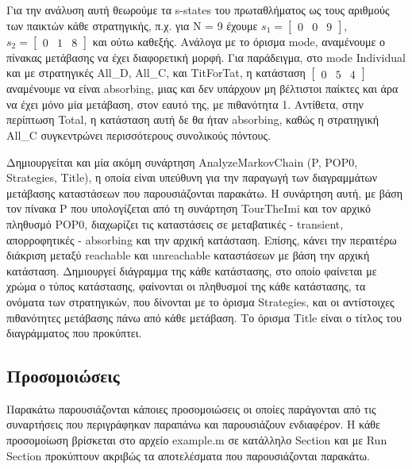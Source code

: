 \documentclass[12pt]{article}
\begin{document}
Για την ανάλυση αυτή θεωρούμε τα s-states του πρωταθλήματος ως τους αριθμούς των παικτών κάθε στρατηγικής, π.χ. για N = 9 έχουμε $s_1 = \begin{bmatrix} 0 & 0 & 9 \end{bmatrix}$, $s_2 = \begin{bmatrix} 0 & 1 & 8 \end{bmatrix}$ και ούτω καθεξής. Ανάλογα με το όρισμα mode, αναμένουμε ο πίνακας μετάβασης να έχει διαφορετική μορφή. Για παράδειγμα, στο mode Individual και με στρατηγικές All\_D, All\_C, και TitForTat, η κατάσταση $\begin{bmatrix} 0 & 5 & 4 \end{bmatrix}$ αναμένουμε να είναι absorbing, μιας και δεν υπάρχουν μη βέλτιστοι παίκτες και άρα να έχει μόνο μία μετάβαση, στον εαυτό της, με πιθανότητα 1. Αντίθετα, στην περίπτωση Total, η κατάσταση αυτή δε θα ήταν absorbing, καθώς η στρατηγική All\_C συγκεντρώνει περισσότερους συνολικούς πόντους.

Δημιουργείται και μία ακόμη συνάρτηση AnalyzeMarkovChain\- (P,\- POP0,\- Str\-at\-e\-gies,\- Title), η οποία είναι υπεύθυνη για την παραγωγή των διαγραμμάτων μετάβασης καταστάσεων που παρουσιάζονται παρακάτω. Η συνάρτηση αυτή, με βάση τον πίνακα P που υπολογίζεται από τη συνάρτηση TourTheImi και τον αρχικό πληθυσμό POP0, διαχωρίζει τις καταστάσεις σε μεταβατικές - transient, απορροφητικές - absorbing και την αρχική κατάσταση. Επίσης, κάνει την περαιτέρω διάκριση μεταξύ reachable και unreachable καταστάσεων με βάση την αρχική κατάσταση. Δημιουργεί διάγραμμα της κάθε κατάστασης, στο οποίο φαίνεται με χρώμα ο τύπος κατάστασης, φαίνονται οι πληθυσμοί της κάθε κατάστασης, τα ονόματα των στρατηγικών, που δίνονται με το όρισμα Strategies, και οι αντίστοιχες πιθανότητες μετάβασης πάνω από κάθε μετάβαση. Το όρισμα Title είναι ο τίτλος του διαγράμματος που προκύπτει. 
\subsection{Προσομοιώσεις}
Παρακάτω παρουσιάζονται κάποιες προσομοιώσεις οι οποίες παράγονται από τις συναρτήσεις που περιγράφηκαν παραπάνω και παρουσιάζουν ενδιαφέρον. Η κάθε προσομοίωση βρίσκεται στο αρχείο example.m σε κατάλληλο Section και με Run Section προκύπτουν ακριβώς τα αποτελέσματα που παρουσιάζονται παρακάτω.
\end{document}
